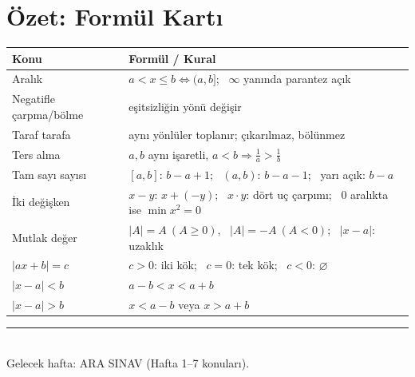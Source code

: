 \documentclass[11pt,a4paper]{article}
\newcounter{alis}
\begin{document}
\section{Özet: Formül Kartı}
\begin{center}
\renewcommand{\arraystretch}{1.35}
\begin{tabular}{@{}ll@{}}
\toprule
Konu & Formül / Kural\\\midrule
Aralık & \(a<x\le b\Leftrightarrow (a,b]\); \ \(\infty\) yanında parantez açık\\
Negatifle çarpma/bölme & eşitsizliğin yönü değişir\\
Taraf tarafa & aynı yönlüler toplanır; çıkarılmaz, bölünmez\\
Ters alma & \(a,b\) aynı işaretli, \(a<b\Rightarrow \frac1a>\frac1b\)\\
Tam sayı sayısı & \([a,b]\): \(b-a+1\); \ \((a,b)\): \(b-a-1\); \ yarı açık: \(b-a\)\\
İki değişken & \(x-y\): \(x+(-y)\); \ \(x\cdot y\): dört uç çarpımı; \ \(0\) aralıkta ise \(\min x^2=0\)\\
Mutlak değer & \(|A|=A\ (A\ge0)\), \ \(|A|=-A\ (A<0)\); \ \(|x-a|\): uzaklık\\
\(|ax+b|=c\) & \(c>0\): iki kök; \ \(c=0\): tek kök; \ \(c<0\): \(\varnothing\)\\
\(|x-a|<b\) & \(a-b<x<a+b\)\\
\(|x-a|>b\) & \(x<a-b\) veya \(x>a+b\)\\\bottomrule
\end{tabular}
\end{center}



\vspace{6pt}
\noindent\textcolor{anamavi}{\rule{\textwidth}{0.5pt}}\\
{\small Gelecek hafta: ARA SINAV (Hafta 1--7 konuları).}
\end{document}
